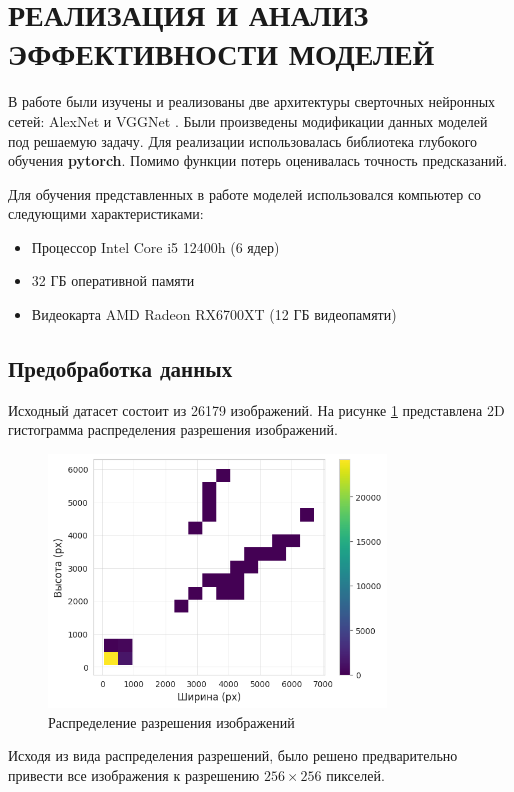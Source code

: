 \section{РЕАЛИЗАЦИЯ И АНАЛИЗ ЭФФЕКТИВНОСТИ МОДЕЛЕЙ}

В работе были изучены и реализованы две архитектуры сверточных нейронных сетей: AlexNet \cite{alexnet} и VGGNet \cite{vggnet}.
Были произведены модификации данных моделей под решаемую задачу.
Для реализации использовалась библиотека глубокого обучения \textbf{pytorch}.
Помимо функции потерь оценивалась точность предсказаний.

Для обучения представленных в работе моделей использовался компьютер со следующими характеристиками:
\begin{itemize}
    \item Процессор Intel Core i5 12400h (6 ядер)
    \item 32 ГБ оперативной памяти
    \item Видеокарта AMD Radeon RX6700XT (12 ГБ видеопамяти)
\end{itemize}

\subsection{Предобработка данных}

Исходный датасет состоит из 26179 изображений.
На рисунке \ref{fig:dist} представлена 2D гистограмма распределения разрешения изображений.
\begin{figure}[h]
    \centering
    \includegraphics[width=0.8\textwidth]{images/data_dist.png}
    \caption{Распределение разрешения изображений}
    \label{fig:dist}
\end{figure}

Исходя из вида распределения разрешений, было решено предварительно привести все изображения к разрешению $256 \times 256$ пикселей.

